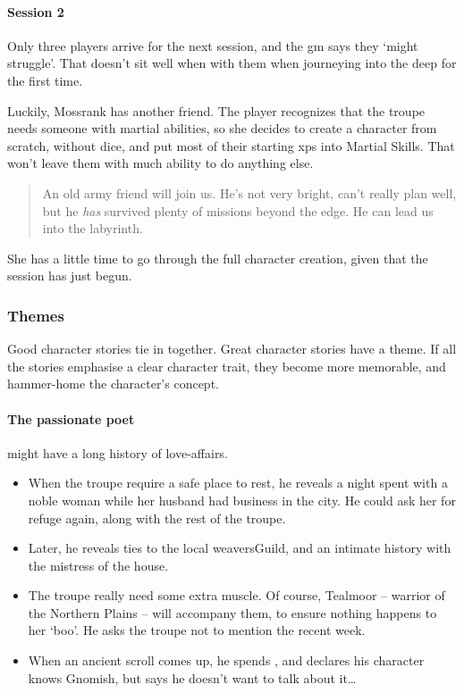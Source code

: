 \begin{multicols}{2}
\begin{exampletext}
\end{exampletext}

\begin{exampletext}
  \paragraph{Session 2}
  Only three players arrive for the next session, and the \gls{gm} says they `might struggle'.
  That doesn't sit well when with them when journeying into the \gls{deep} for the first time.

  Luckily, Mossrank has another friend.
  The player recognizes that the troupe needs someone with martial abilities, so she decides to create a character from scratch, without dice, and put most of their starting \glspl{xp} into Martial Skills.
  That won't leave them with much ability to do anything else.

  \begin{quotation}
    An old army friend will join us.
    He's not very bright, can't really plan well, but he \emph{has} survived plenty of missions beyond the \gls{edge}.
    He can lead us into the labyrinth.
  \end{quotation}

  She has a little time to go through the full character creation, given that the session has just begun.
\end{exampletext}

\subsubsection{Themes}

Good character stories tie in together.
Great character stories have a theme.
If all the stories emphasise a clear character trait, they become more memorable, and hammer-home the character's concept.

\paragraph{The passionate poet}
might have a long history of love-affairs.

\begin{itemize}
  \item
  When the troupe require a safe place to rest, he reveals a night spent with a noble woman while her husband had business in the city.
  He could ask her for refuge again, along with the rest of the troupe.
  \item
  Later, he reveals ties to the local \gls{weaversGuild}, and an intimate history with the mistress of the house.
  \item
  The troupe really need some extra muscle.
  Of course, Tealmoor -- warrior of the Northern Plains -- will accompany them, to ensure nothing happens to her `boo'.
  He asks the troupe not to mention the recent week.
  \item
  When an ancient scroll comes up, he spends , and declares his character knows Gnomish, but says he doesn't want to talk about it\ldots
\end{itemize}


\end{multicols}
